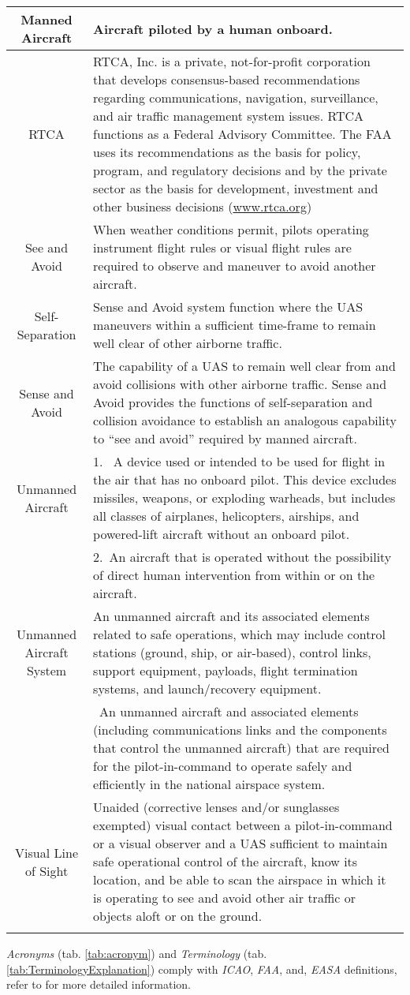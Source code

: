 \begin{tabularx}{\textwidth}{S{0.22}|X}
     Manned Aircraft & Aircraft piloted by a human onboard.\\\hline
     RTCA & RTCA, Inc. is a private, not-for-profit corporation that develops consensus-based recommendations regarding communications, navigation, surveillance, and air traffic management system issues. RTCA functions as a Federal Advisory Committee. The FAA uses its recommendations as the basis for policy, program, and regulatory decisions and by the private sector as the basis for development, investment and other business decisions  (\url{www.rtca.org})\\\hline
     See and Avoid & When weather conditions permit, pilots operating instrument flight rules or visual flight rules are required to observe and maneuver to avoid another aircraft. \\\hline
     Self-Separation & Sense and Avoid system function where the UAS maneuvers within a sufficient time-frame to remain well clear of other airborne traffic.\\\hline 
     Sense and Avoid & The capability of a UAS to remain well clear from and avoid collisions with other airborne traffic. Sense and Avoid provides the functions of self-separation and collision avoidance to establish an analogous capability to “see and avoid” required by manned aircraft.\\\hline
     Unmanned Aircraft & 1.~ A device used or intended to be used for flight in the air that has no onboard pilot. This device excludes missiles, weapons, or exploding warheads, but includes all classes of airplanes, helicopters, airships, and powered-lift aircraft without an onboard pilot.\\
     &2.~An aircraft that is operated without the possibility of direct human intervention from within or on the aircraft.\\\hline
     Unmanned Aircraft System & An unmanned aircraft and its associated elements related to safe operations, which may include control stations (ground, ship, or air-based), control links, support equipment, payloads, flight termination systems, and launch/recovery equipment.\\
     &~An unmanned aircraft and associated elements (including communications links and the components that control the unmanned aircraft) that are required for the pilot-in-command to operate safely and efficiently in the national airspace system. \\\hline
     Visual Line of Sight & Unaided (corrective lenses and/or sunglasses exempted) visual contact between a pilot-in-command or a visual observer and a UAS sufficient to maintain safe operational control of the aircraft, know its location, and be able to scan the airspace in which it is operating to see and avoid other air traffic or objects aloft or on the ground.\\
     \caption{Terminology}
     \label{tab:TerminologyExplanation}
\end{tabularx}

\begin{note}
\emph{Acronyms} (tab. \ref{tab:acronym}) and \emph{Terminology} (tab. \ref{tab:TerminologyExplanation}) comply with \emph{ICAO}, \emph{FAA}, and, \emph{EASA} definitions, refer to  \cite{huerta2013integration} for more detailed information.
\end{note}